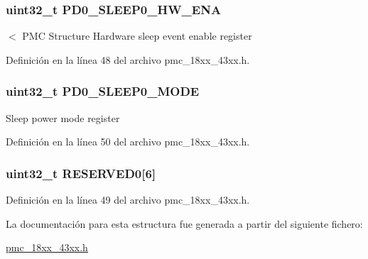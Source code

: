 \subsubsection[{\texorpdfstring{P\+D0\+\_\+\+S\+L\+E\+E\+P0\+\_\+\+H\+W\+\_\+\+E\+NA}{PD0_SLEEP0_HW_ENA}}]{ uint32\+\_\+t P\+D0\+\_\+\+S\+L\+E\+E\+P0\+\_\+\+H\+W\+\_\+\+E\+NA}\hypertarget{struct_l_p_c___p_m_c___t_a179694e15b55b5bc4d82b43a61f6def6}{}\label{struct_l_p_c___p_m_c___t_a179694e15b55b5bc4d82b43a61f6def6}
$<$ P\+MC Structure Hardware sleep event enable register 

Definición en la línea 48 del archivo pmc\+\_\+18xx\+\_\+43xx.\+h.

\subsubsection[{\texorpdfstring{P\+D0\+\_\+\+S\+L\+E\+E\+P0\+\_\+\+M\+O\+DE}{PD0_SLEEP0_MODE}}]{ uint32\+\_\+t P\+D0\+\_\+\+S\+L\+E\+E\+P0\+\_\+\+M\+O\+DE}\hypertarget{struct_l_p_c___p_m_c___t_a316f4f2e318a0caf15cb8e2f9fa51ab4}{}\label{struct_l_p_c___p_m_c___t_a316f4f2e318a0caf15cb8e2f9fa51ab4}
Sleep power mode register 

Definición en la línea 50 del archivo pmc\+\_\+18xx\+\_\+43xx.\+h.

\subsubsection[{\texorpdfstring{R\+E\+S\+E\+R\+V\+E\+D0}{RESERVED0}}]{ uint32\+\_\+t R\+E\+S\+E\+R\+V\+E\+D0\mbox{[}6\mbox{]}}\hypertarget{struct_l_p_c___p_m_c___t_a68314c84c664e7f67d241a789299ceee}{}\label{struct_l_p_c___p_m_c___t_a68314c84c664e7f67d241a789299ceee}


Definición en la línea 49 del archivo pmc\+\_\+18xx\+\_\+43xx.\+h.



La documentación para esta estructura fue generada a partir del siguiente fichero\+:\begin{DoxyCompactItemize}
\item 
\hyperlink{pmc__18xx__43xx_8h}{pmc\+\_\+18xx\+\_\+43xx.\+h}\end{DoxyCompactItemize}

